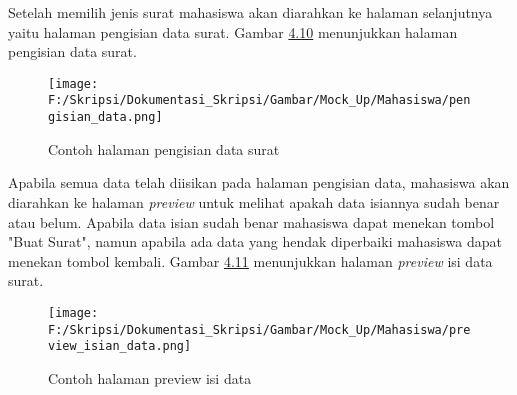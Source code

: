 \begin{enumerate}
	Setelah memilih jenis surat mahasiswa akan diarahkan ke halaman selanjutnya yaitu halaman pengisian data surat. Gambar \hyperlink{contoh_halaman_pengisian_data_surat}{4.10} menunjukkan halaman pengisian data surat.
	\begin{figure}[H]
	\centering
		\texttt{[image: F:/Skripsi/Dokumentasi\_Skripsi/Gambar/Mock\_Up/Mahasiswa/pengisian\_data.png]}
		\caption{Contoh halaman pengisian data surat}
		\label{fig:contoh_halaman_pengisian_data_surat}
	\end{figure}
	
	Apabila semua data telah diisikan pada halaman pengisian data, mahasiswa akan diarahkan ke halaman \textit{preview} untuk melihat apakah data isiannya sudah benar atau belum. Apabila data isian sudah benar mahasiswa dapat menekan tombol "Buat Surat", namun apabila ada data yang hendak diperbaiki mahasiswa dapat menekan tombol kembali. Gambar \hyperlink{contoh_halaman_preview_isi_data}{4.11} menunjukkan halaman \textit{preview} isi data surat.
	\begin{figure}[H]
	\centering
		\texttt{[image: F:/Skripsi/Dokumentasi\_Skripsi/Gambar/Mock\_Up/Mahasiswa/preview\_isian\_data.png]}
		\caption{Contoh halaman preview isi data}
		\label{fig:contoh_halaman_preview_isi_data}
	\end{figure}
\end{enumerate}

